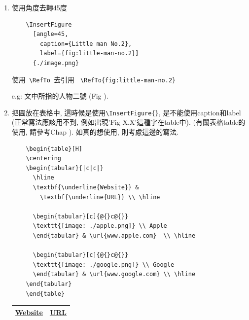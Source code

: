 \begin{enumerate}
  \newpage
  \item
  {
    使用角度去轉45度
    \begin{verbatim}
    \InsertFigure
      [angle=45,
        caption={Little man No.2},
        label={fig:little-man-no.2}]
      {./image.png}
    \end{verbatim}

    使用\verb| \RefTo |去引用 \verb| \RefTo{fig:little-man-no.2} |

    e.g: 文中所指的人物二號 (Fig ).
  } %

  \newpage
  \item
  {
    把圖放在表格中, 這時候是使用\verb|\InsertFigure{}|, 是不能使用caption和label (正常寫法應該用不到, 例如出現'Fig X.X'這種字在table中). (有關表格table的使用, 請參考Chap ). 如真的想使用, 則考慮這邊的寫法.

    \begin{verbatim}
    \begin{table}[H]
    \centering
    \begin{tabular}{|c|c|}
      \hline
      \textbf{\underline{Website}} &
        \textbf{\underline{URL}} \\ \hline

      \begin{tabular}[c]{@{}c@{}}
      \texttt{[image: ./apple.png]} \\ Apple
      \end{tabular} & \url{www.apple.com}  \\ \hline

      \begin{tabular}[c]{@{}c@{}}
      \texttt{[image: ./google.png]} \\ Google
      \end{tabular} & \url{www.google.com} \\ \hline
    \end{tabular}
    \end{table}
    \end{verbatim}

    \begin{table}[H]
    \centering
    \label{table:how-to:write:image:insert-image-into-table}
    \begin{tabular}{|c|c|}
      \hline
      \textbf{\underline{Website}} &
        \textbf{\underline{URL}} \\ \hline


\end{tabular}
\end{table}}
\end{enumerate}
